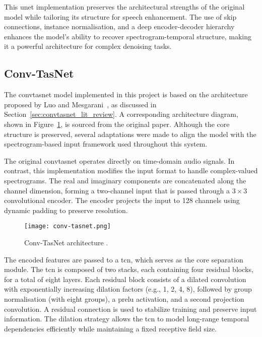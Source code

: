 This \gls{unet} implementation preserves the architectural strengths of the original model while tailoring its structure for speech enhancement. The use of skip connections, instance normalisation, and a deep encoder-decoder hierarchy enhances the model’s ability to recover spectrogram-temporal structure, making it a powerful architecture for complex denoising tasks.

\subsection{Conv-TasNet}
\label{sec:convtasnet}

The \gls{convtasnet} model implemented in this project is based on the architecture proposed by Luo and Mesgarani~\cite{Luo2018ConvTasNetSI}, as discussed in Section~\ref{sec:convtasnet_lit_review}. A corresponding architecture diagram, shown in Figure~\ref{fig:convtasnet}, is sourced from the original paper. Although the core structure is preserved, several adaptations were made to align the model with the spectrogram-based input framework used throughout this system.

The original \gls{convtasnet} operates directly on time-domain audio signals. In contrast, this implementation modifies the input format to handle complex-valued spectrograms. The real and imaginary components are concatenated along the channel dimension, forming a two-channel input that is passed through a \(3 \times 3\) convolutional encoder. The encoder projects the input to 128 channels using dynamic padding to preserve resolution.

\begin{figure}[h]
    \centering
    \texttt{[image: conv-tasnet.png]}
    \caption{\label{fig:convtasnet} Conv-TasNet architecture \cite{Luo2018ConvTasNetSI}.}
\end{figure}

The encoded features are passed to a \gls{tcn}, which serves as the core separation module. The \gls{tcn} is composed of two stacks, each containing four residual blocks, for a total of eight layers. Each residual block consists of a dilated convolution with exponentially increasing dilation factors (e.g., 1, 2, 4, 8), followed by group normalisation (with eight groups), a \gls{prelu} activation, and a second projection convolution. A residual connection is used to stabilize training and preserve input information. The dilation strategy allows the \gls{tcn} to model long-range temporal dependencies efficiently while maintaining a fixed receptive field size.

